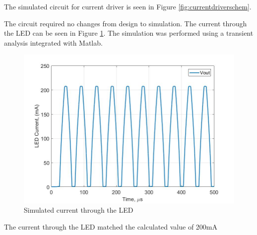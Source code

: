 The simulated circuit for current driver is seen in Figure \ref{fig:currentdriverschem}.

The circuit required no changes from design to simulation. The current through the LED can be seen in Figure \ref{fig:simcurrentlab4}. The simulation was performed using a transient analysis integrated with Matlab.

\begin{figure}
	\centering
	\includegraphics[width=0.7\linewidth]{CircuitDevelopment/sim_current_lab4}
	\caption[Simulated current]{Simulated current through the LED}
	\label{fig:simcurrentlab4}
\end{figure}

The current through the LED matched the calculated value of 200mA



